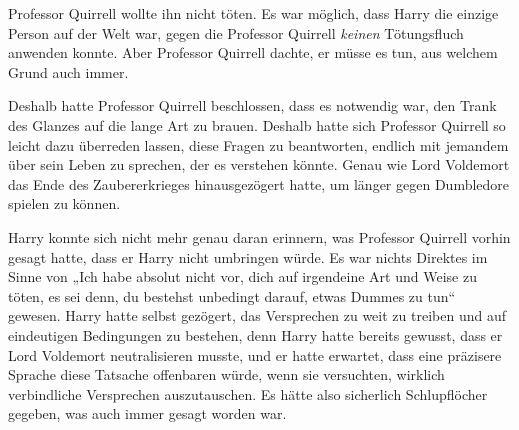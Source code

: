 Professor Quirrell wollte ihn nicht töten. Es war möglich, dass Harry die einzige Person auf der Welt war, gegen die Professor Quirrell \emph{keinen} Tötungsfluch anwenden konnte. Aber Professor Quirrell dachte, er müsse es tun, aus welchem Grund auch immer.

Deshalb hatte Professor Quirrell beschlossen, dass es notwendig war, den Trank des Glanzes auf die lange Art zu brauen. Deshalb hatte sich Professor Quirrell so leicht dazu überreden lassen, diese Fragen zu beantworten, endlich mit jemandem über sein Leben zu sprechen, der es verstehen könnte. Genau wie Lord Voldemort das Ende des Zaubererkrieges hinausgezögert hatte, um länger gegen Dumbledore spielen zu können.

Harry konnte sich nicht mehr genau daran erinnern, was Professor Quirrell vorhin gesagt hatte, dass er Harry nicht umbringen würde. Es war nichts Direktes im Sinne von „Ich habe absolut nicht vor, dich auf irgendeine Art und Weise zu töten, es sei denn, du bestehst unbedingt darauf, etwas Dummes zu tun“ gewesen. Harry hatte selbst gezögert, das Versprechen zu weit zu treiben und auf eindeutigen Bedingungen zu bestehen, denn Harry hatte bereits gewusst, dass er Lord Voldemort neutralisieren musste, und er hatte erwartet, dass eine präzisere Sprache diese Tatsache offenbaren würde, wenn sie versuchten, wirklich verbindliche Versprechen auszutauschen.
Es hätte also sicherlich Schlupflöcher gegeben, was auch immer gesagt worden war.

